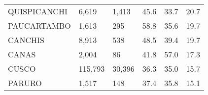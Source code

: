 \begin{tabular}{llllll}
	\cellcolor[HTML]{FF5050}QUISPICANCHI                           & 6,619                                                                 & 1,413                                                            & 45.6                                                                             & 33.7                                                                        & 20.7                                                                                \\
	\cellcolor[HTML]{FF5050}PAUCARTAMBO                            & 1,613                                                                 & 295                                                              & 58.8                                                                             & 35.6                                                                        & 19.7                                                                                \\
	\cellcolor[HTML]{FF5050}CANCHIS                                & 8,913                                                                 & 538                                                              & 48.5                                                                             & 39.4                                                                        & 19.7                                                                                \\
	\cellcolor[HTML]{FF5050}CANAS                                  & 2,004                                                                 & 86                                                               & 41.8                                                                             & 57.0                                                                        & 17.3                                                                                \\
	\cellcolor[HTML]{F8CBAD}CUSCO                                  & 115,793                                                               & 30,396                                                           & 36.3                                                                             & 35.0                                                                        & 15.7                                                                                \\
	\cellcolor[HTML]{F8CBAD}PARURO                                 & 1,517                                                                 & 148                                                              & 37.4                                                                             & 35.8                                                                        & 15.1                                                                                \\

\end{tabular}
